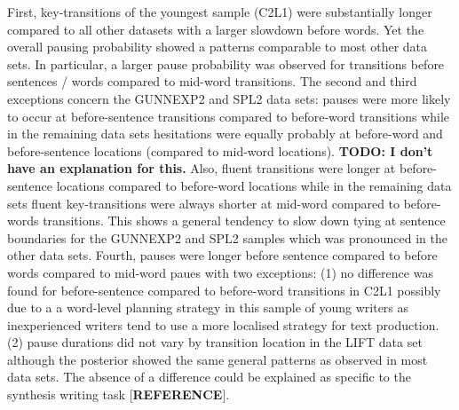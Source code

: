 \documentclass[
  english,
  man,floatsintext]{apa7}
\begin{document}
First, key-transitions of the youngest sample (C2L1) were substantially longer compared to all other datasets with a larger slowdown before words. Yet the overall pausing probability showed a patterns comparable to most other data sets. In particular, a larger pause probability was observed for transitions before sentences / words compared to mid-word transitions. The second and third exceptions concern the GUNNEXP2 and SPL2 data sets: pauses were more likely to occur at before-sentence transitions compared to before-word transitions while in the remaining data sets hesitations were equally probably at before-word and before-sentence locations (compared to mid-word locations). \textbf{TODO: I don't have an explanation for this.} Also, fluent transitions were longer at before-sentence locations compared to before-word locations while in the remaining data sets fluent key-transitions were always shorter at mid-word compared to before-words transitions. This shows a general tendency to slow down tying at sentence boundaries for the GUNNEXP2 and SPL2 samples which was pronounced in the other data sets. Fourth, pauses were longer before sentence compared to before words compared to mid-word paues with two exceptions: (1) no difference was found for before-sentence compared to before-word transitions in C2L1 possibly due to a a word-level planning strategy in this sample of young writers as inexperienced writers tend to use a more localised strategy for text production. (2) pause durations did not vary by transition location in the LIFT data set although the posterior showed the same general patterns as observed in most data sets. The absence of a difference could be explained as specific to the synthesis writing task {[}\textbf{REFERENCE}{]}.
\end{document}
